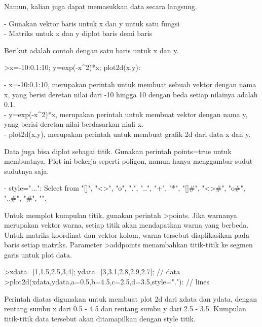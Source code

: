 \documentclass[a4paper,10pt]{article}
\begin{document}
\begin{eulernotebook}
\begin{eulercomment}
\begin{eulercomment}
\begin{eulercomment}
\begin{eulercomment}
\begin{eulercomment}
Namun, kalian juga dapat memasukkan data secara langsung.

- Gunakan vektor baris untuk x dan y untuk satu fungsi\\
- Matriks untuk x dan y diplot baris demi  baris

Berikut adalah contoh dengan satu baris untuk x dan y.
\end{eulercomment}
\begin{eulerprompt}
>x=-10:0.1:10; y=exp(-x^2)*x; plot2d(x,y):
\end{eulerprompt}
\begin{eulercomment}
- x=-10:0.1:10, merupakan perintah untuk membuat sebuah vektor dengan
nama x, yang berisi deretan nilai dari -10 hingga 10 dengan beda
setiap nilainya adalah 0.1.\\
- y=exp(-x\textasciicircum{}2)*x, merupakan perintah untuk membuat vektor dengan nama
y, yang berisi deretan nilai berdasarkan niali x.\\
- plot2d(x,y), merupakan perintah untuk membuat grafik 2d dari data x
dan y.

Data juga bisa diplot sebagai titik. Gunakan perintah points=true
untuk membuatnya. Plot ini bekerja seperti poligon, namun hanya
menggambar sudut-sudutnya saja.

- style="...": Select from "[]", "\textless{}\textgreater{}", "o", ".", "..", "+", "*",
"[]#", "\textless{}\textgreater{}#", "o#", "..#", "#", "\textbar{}".

Untuk memplot kumpulan titik, gunakan perintah \textgreater{}points. Jika warnanya
merupakan vektor warna, setiap titik akan mendapatkan warna yang
berbeda. Untuk matriks koordinat dan vektor kolom, warna tersebut
diaplikasikan pada baris setiap matriks. Parameter \textgreater{}addpoints
menambahkan titik-titik ke segmen garis untuk plot data.
\end{eulercomment}
\begin{eulerprompt}
>xdata=[1,1.5,2.5,3,4]; ydata=[3,3.1,2.8,2.9,2.7]; // data
>plot2d(xdata,ydata,a=0.5,b=4.5,c=2.5,d=3.5,style="."): // lines
\end{eulerprompt}
\begin{eulercomment}
Perintah diatas digunakan untuk membuat plot 2d dari xdata dan ydata,
dengan rentang sumbu x dari 0.5 - 4.5 dan rentang sumbu y dari 2.5 -
3.5. Kumpulan titik-titik data tersebut akan ditamapilkan dengan style
titik.


\end{eulercomment}
\end{eulercomment}
\end{eulercomment}
\end{eulercomment}
\end{eulercomment}
\end{eulernotebook}
\end{document}
